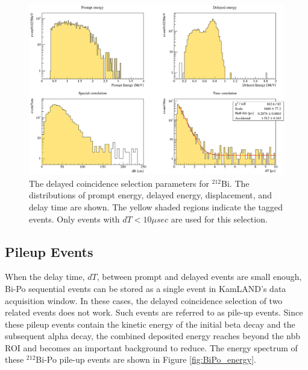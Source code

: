 \begin{figure}[htb]
	\centering
	\includegraphics[scale=0.45]{bi212.png}
	\caption{The delayed coincidence selection parameters for $^{212}$Bi. The distributions of prompt energy, delayed energy, displacement, and delay time are shown. The yellow shaded regions indicate the tagged events. Only events with $dT<10\mu sec$ are used for this selection.}
	\label{fig:BiPo212}
\end{figure}
\subsection*{Pileup Events}
\label{sec:dpfit}
When the delay time, $dT$, between prompt and delayed events are small enough, Bi-Po sequential events can be stored as a single event in KamLAND's data acquisition window. In these cases, the delayed coincidence selection of two related events does not work. Such events are referred to as pile-up events. Since these pileup events contain the kinetic energy of the initial beta decay and the subsequent alpha decay, the combined deposited energy reaches beyond the \0nbb ROI and becomes an important background to reduce. The energy spectrum of these $^{212}$Bi-Po pile-up events are shown in Figure \ref{fig:BiPo_energy}.

